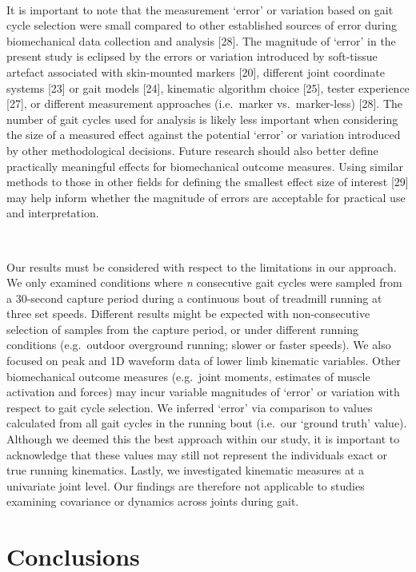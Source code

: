 \documentclass[]{elsarticle} %
\begin{document}
~

It is important to note that the measurement `error' or variation based
on gait cycle selection were small compared to other established sources
of error during biomechanical data collection and analysis {[}28{]}. The
magnitude of `error' in the present study is eclipsed by the errors or
variation introduced by soft-tissue artefact associated with
skin-mounted markers {[}20{]}, different joint coordinate systems
{[}23{]} or gait models {[}24{]}, kinematic algorithm choice {[}25{]},
tester experience {[}27{]}, or different measurement approaches
(i.e.~marker vs.~marker-less) {[}28{]}. The number of gait cycles used
for analysis is likely less important when considering the size of a
measured effect against the potential `error' or variation introduced by
other methodological decisions. Future research should also better
define practically meaningful effects for biomechanical outcome
measures. Using similar methods to those in other fields for defining
the smallest effect size of interest {[}29{]} may help inform whether
the magnitude of errors are acceptable for practical use and
interpretation.

~

Our results must be considered with respect to the limitations in our
approach. We only examined conditions where \emph{n} consecutive gait
cycles were sampled from a 30-second capture period during a continuous
bout of treadmill running at three set speeds. Different results might
be expected with non-consecutive selection of samples from the capture
period, or under different running conditions (e.g.~outdoor overground
running; slower or faster speeds). We also focused on peak and 1D
waveform data of lower limb kinematic variables. Other biomechanical
outcome measures (e.g.~joint moments, estimates of muscle activation and
forces) may incur variable magnitudes of `error' or variation with
respect to gait cycle selection. We inferred `error' via comparison to
values calculated from all gait cycles in the running bout (i.e.~our
`ground truth' value). Although we deemed this the best approach within
our study, it is important to acknowledge that these values may still
not represent the individuals exact or true running kinematics. Lastly,
we investigated kinematic measures at a univariate joint level. Our
findings are therefore not applicable to studies examining covariance or
dynamics across joints during gait.

\hypertarget{conclusions}{%
\section{Conclusions}\label{conclusions}}
\end{document}
